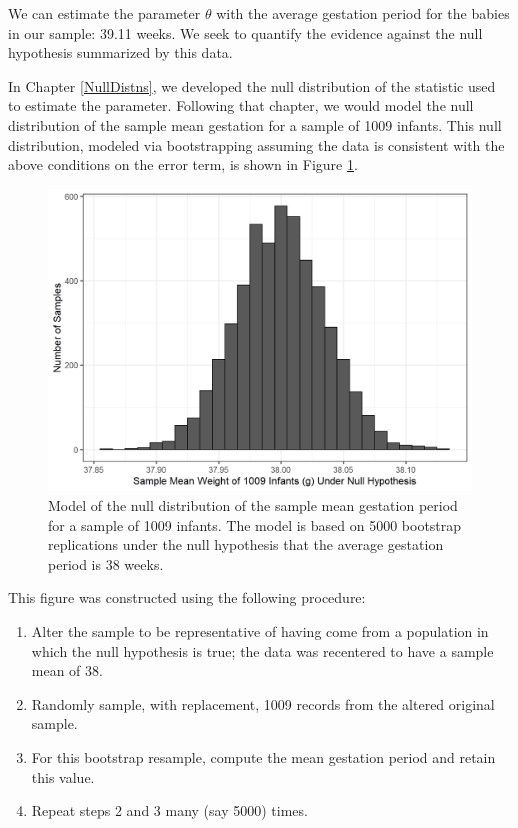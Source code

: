 \documentclass[
]{book}
\providecommand{\tightlist}{%
  \setlength{\itemsep}{0pt}\setlength{\parskip}{0pt}}
\theoremstyle{plain}
\theoremstyle{mydefn}
\theoremstyle{myexmpl}
\theoremstyle{remark}
\begin{document}
We can estimate the parameter \(\theta\) with the average gestation period for the babies in our sample: 39.11 weeks. We seek to quantify the evidence against the null hypothesis summarized by this data.

In Chapter \ref{NullDistns}, we developed the null distribution of the statistic used to estimate the parameter. Following that chapter, we would model the null distribution of the sample mean gestation for a sample of 1009 infants. This null distribution, modeled via bootstrapping assuming the data is consistent with the above conditions on the error term, is shown in Figure \ref{fig:singleteststat-null-mean}.

\begin{figure}

{\centering \includegraphics[width=0.8\linewidth]{./Images/singleteststat-null-mean-1} 

}

\caption{Model of the null distribution of the sample mean gestation period for a sample of 1009 infants. The model is based on 5000 bootstrap replications under the null hypothesis that the average gestation period is 38 weeks.}\label{fig:singleteststat-null-mean}
\end{figure}

This figure was constructed using the following procedure:

\begin{enumerate}
\def\labelenumi{\arabic{enumi}.}
\tightlist
\item
  Alter the sample to be representative of having come from a population in which the null hypothesis is true; the data was recentered to have a sample mean of 38.
\item
  Randomly sample, with replacement, 1009 records from the altered original sample.
\item
  For this bootstrap resample, compute the mean gestation period and retain this value.
\item
  Repeat steps 2 and 3 many (say 5000) times.
\end{enumerate}
\end{document}
